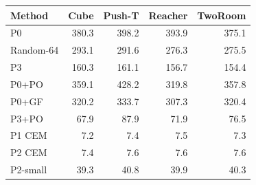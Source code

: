 \begin{tabular}{lrrrr}
\toprule
Method & Cube & Push-T & Reacher & TwoRoom \\
\midrule
P0 & 380.3 & 398.2 & 393.9 & 375.1 \\
Random-64 & 293.1 & 291.6 & 276.3 & 275.5 \\
P3 & 160.3 & 161.1 & 156.7 & 154.4 \\
P0+PO & 359.1 & 428.2 & 319.8 & 357.8 \\
P0+GF & 320.2 & 333.7 & 307.3 & 320.4 \\
P3+PO & 67.9 & 87.9 & 71.9 & 76.5 \\
P1 CEM & 7.2 & 7.4 & 7.5 & 7.3 \\
P2 CEM & 7.4 & 7.6 & 7.6 & 7.6 \\
P2-small & 39.3 & 40.8 & 39.9 & 40.3 \\
\bottomrule
\end{tabular}
